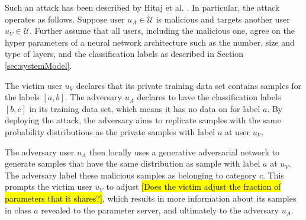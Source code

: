 \documentclass[conference]{IEEEtran}
\begin{document}





Such an attack has been described by Hitaj et al. \cite{hitaj2017deep}. In particular, the attack operates as follows. 
Suppose user $u_A\in\mathcal{U}$ is malicious and targets another user $u_V\in\mathcal{U}$. Further assume that all users, including
the malicious one, agree on the hyper parameters of a neural network architecture such as the number, size and type of layers,  and the
classification labels as described in Section \ref{sec:systemModel}.

The victim user $u_V$ declares that its private training data set contains samples for the  labels $[a,b]$. The adversary
$u_A$ declares to have the classification labels $[b,c]$ in its training data set, which means it has no data on for label $a$. By
deploying the attack, the adversary aims to replicate samples with the same probability distributions as the private samples with label
$a$ at user $u_V$.

The adversary user $u_A$ then locally uses a generative adversarial network to generate samples that have the same distribution as
sample with label $a$ at $u_V$. The adversary label these malicious samples as belonging to category $c$. This prompts the victim 
user $u_V$ to adjust \hl{[Does the victim adjust the fraction of parameters that it shares?]}, which results in more information about
its samples in class $a$ revealed to the parameter server, and ultimately to the adversary $u_A$. 
\end{document}
